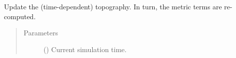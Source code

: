 \documentclass[letterpaper,10pt,english]{sphinxmanual}
\begin{document}
\begin{fulllineitems}
\begin{fulllineitems}
\begin{quote}
\begin{description}
\end{description}\end{quote}

\end{fulllineitems}


\begin{fulllineitems}
\label{\detokenize{api:grids.gal_chen.GalChen2d.update_topography}}
Update the (time-dependent) topography. In turn, the metric terms are re-computed.
\begin{quote}\begin{description}
\item[{Parameters}] \leavevmode
{} () \textendash{} Current simulation time.

\end{description}\end{quote}

\end{fulllineitems}


\end{fulllineitems}

\end{document}
